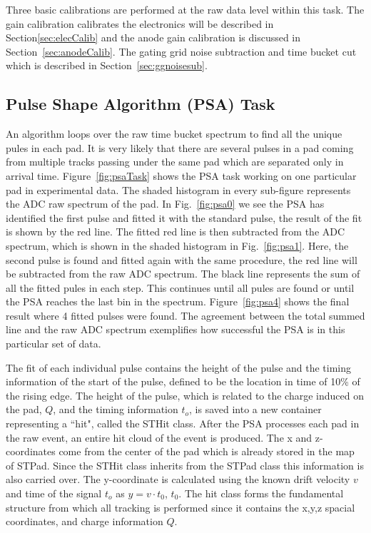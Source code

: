 Three basic calibrations are performed at the raw data level within this task. The gain calibration calibrates the electronics will be described in Section\ref{sec:elecCalib} and the anode gain calibration is discussed in Section~\ref{sec:anodeCalib}. The gating grid noise subtraction and time bucket cut which is described in Section~\ref{sec:ggnoisesub}.


\subsection{Pulse Shape Algorithm (PSA) Task}
\label{sec:psa}
An algorithm loops over the raw time bucket spectrum to find all the unique pules in each pad. It is very likely that there are several pulses in a pad coming from multiple tracks passing under the same pad which are separated only in arrival time. Figure~\ref{fig:psaTask} shows the PSA task working on one particular pad in experimental data. The shaded histogram in every sub-figure represents the ADC raw spectrum of the pad. In Fig.~\ref{fig:psa0} we see the PSA has identified the first pulse and fitted it with the standard pulse, the result of the fit is shown by the red line. The fitted red line is then subtracted from the ADC spectrum, which is shown in the shaded histogram in Fig.~\ref{fig:psa1}. Here, the second pulse is found and fitted again with the same procedure, the red line will be subtracted from the raw ADC spectrum. The black line represents the sum of all the fitted pules in each step. This continues until all pules are found or until the PSA reaches the last bin in the spectrum. Figure~\ref{fig:psa4} shows the final result where 4 fitted pulses were found. The agreement between the total summed line and the raw ADC spectrum exemplifies how successful the PSA is in this particular set of data. 




The fit of each individual pulse contains the height of the pulse and the timing information of the start of the pulse, defined to be the location in time of 10\% of the rising edge. The height of the pulse, which is related to the charge induced on the pad, $Q$, and the timing information $t_o$, is saved into a new container representing a ``hit", called the STHit class. After the PSA processes each pad in the raw event, an entire hit cloud of the event is produced. The x and z-coordinates come from the center of the pad which is already stored in the map of STPad. Since the STHit class inherits from the STPad class this information is also carried over. The y-coordinate is calculated using the known drift velocity $v$ and time of the signal $t_o$ as $y = v\cdot t_0$, $t_0$. The hit class forms the fundamental structure from which all tracking is performed since it contains the x,y,z spacial coordinates, and charge information $Q$.


